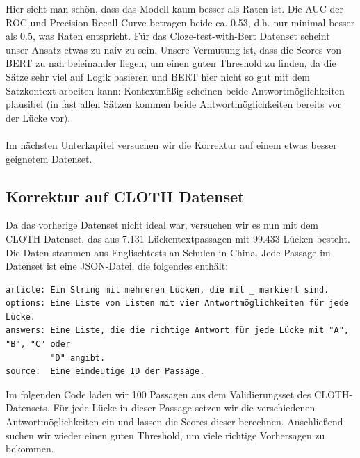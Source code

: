\documentclass[a4paper, 11pt]{article}          %
\begin{document}
\noindent
Hier sieht man schön, dass das Modell kaum besser als Raten ist. Die AUC der ROC und Precision-Recall Curve betragen beide ca. 0.53, d.h. nur minimal besser als 0.5, was Raten entspricht. \cite{ROCPRCAUC}
Für das Cloze-test-with-Bert Datenset scheint unser Ansatz etwas zu naiv zu sein. Unsere Vermutung ist, dass die Scores von BERT zu nah beieinander liegen, um einen guten Threshold zu finden, da die Sätze sehr viel auf Logik basieren und BERT hier nicht so gut mit dem Satzkontext arbeiten kann: Kontextmäßig scheinen beide Antwortmöglichkeiten plausibel (in fast allen Sätzen kommen beide Antwortmöglichkeiten bereits vor der Lücke vor).  
\\ \\
Im nächsten Unterkapitel versuchen wir die Korrektur auf einem etwas besser geignetem Datenset.
\subsection{Korrektur auf CLOTH Datenset}
Da das vorherige Datenset nicht ideal war, versuchen wir es nun mit dem CLOTH Datenset\cite{CLOTH}\cite{CLOTH_paper}, das aus 7.131 Lückentextpassagen mit 99.433 Lücken besteht. Die Daten stammen aus Englischtests an Schulen in China.
Jede Passage im Datenset ist eine JSON-Datei, die folgendes enthält:
\begin{verbatim}
article: Ein String mit mehreren Lücken, die mit _ markiert sind.
options: Eine Liste von Listen mit vier Antwortmöglichkeiten für jede Lücke.
answers: Eine Liste, die die richtige Antwort für jede Lücke mit "A", "B", "C" oder 
         "D" angibt.
source:  Eine eindeutige ID der Passage.
\end{verbatim}
\noindent
Im folgenden Code laden wir 100 Passagen aus dem Validierungsset des CLOTH-Datensets. Für jede Lücke in dieser Passage setzen wir die verschiedenen Antwortmöglichkeiten ein und lassen die Scores dieser berechnen. Anschließend suchen wir wieder einen guten Threshold, um viele richtige Vorhersagen zu bekommen.
\end{document}
